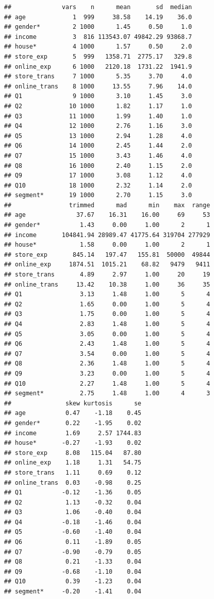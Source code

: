 \documentclass[12pt,]{krantz}
\theoremstyle{definition}
\theoremstyle{definition}
\theoremstyle{definition}
\theoremstyle{remark}
\begin{document}
\begin{verbatim}
##              vars    n      mean       sd  median
## age             1  999     38.58    14.19    36.0
## gender*         2 1000      1.45     0.50     1.0
## income          3  816 113543.07 49842.29 93868.7
## house*          4 1000      1.57     0.50     2.0
## store_exp       5  999   1358.71  2775.17   329.8
## online_exp      6 1000   2120.18  1731.22  1941.9
## store_trans     7 1000      5.35     3.70     4.0
## online_trans    8 1000     13.55     7.96    14.0
## Q1              9 1000      3.10     1.45     3.0
## Q2             10 1000      1.82     1.17     1.0
## Q3             11 1000      1.99     1.40     1.0
## Q4             12 1000      2.76     1.16     3.0
## Q5             13 1000      2.94     1.28     4.0
## Q6             14 1000      2.45     1.44     2.0
## Q7             15 1000      3.43     1.46     4.0
## Q8             16 1000      2.40     1.15     2.0
## Q9             17 1000      3.08     1.12     4.0
## Q10            18 1000      2.32     1.14     2.0
## segment*       19 1000      2.70     1.15     3.0
##                trimmed      mad      min    max  range
## age              37.67    16.31    16.00     69     53
## gender*           1.43     0.00     1.00      2      1
## income       104841.94 28989.47 41775.64 319704 277929
## house*            1.58     0.00     1.00      2      1
## store_exp       845.14   197.47   155.81  50000  49844
## online_exp     1874.51  1015.21    68.82   9479   9411
## store_trans       4.89     2.97     1.00     20     19
## online_trans     13.42    10.38     1.00     36     35
## Q1                3.13     1.48     1.00      5      4
## Q2                1.65     0.00     1.00      5      4
## Q3                1.75     0.00     1.00      5      4
## Q4                2.83     1.48     1.00      5      4
## Q5                3.05     0.00     1.00      5      4
## Q6                2.43     1.48     1.00      5      4
## Q7                3.54     0.00     1.00      5      4
## Q8                2.36     1.48     1.00      5      4
## Q9                3.23     0.00     1.00      5      4
## Q10               2.27     1.48     1.00      5      4
## segment*          2.75     1.48     1.00      4      3
##               skew kurtosis      se
## age           0.47    -1.18    0.45
## gender*       0.22    -1.95    0.02
## income        1.69     2.57 1744.83
## house*       -0.27    -1.93    0.02
## store_exp     8.08   115.04   87.80
## online_exp    1.18     1.31   54.75
## store_trans   1.11     0.69    0.12
## online_trans  0.03    -0.98    0.25
## Q1           -0.12    -1.36    0.05
## Q2            1.13    -0.32    0.04
## Q3            1.06    -0.40    0.04
## Q4           -0.18    -1.46    0.04
## Q5           -0.60    -1.40    0.04
## Q6            0.11    -1.89    0.05
## Q7           -0.90    -0.79    0.05
## Q8            0.21    -1.33    0.04
## Q9           -0.68    -1.10    0.04
## Q10           0.39    -1.23    0.04
## segment*     -0.20    -1.41    0.04
\end{verbatim}
\end{document}
